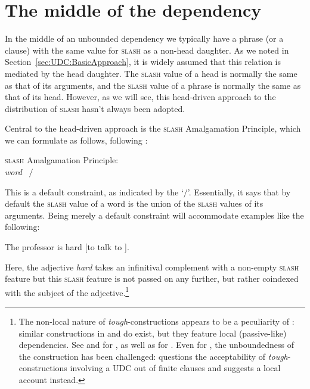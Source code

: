 \documentclass[output=paper,biblatex,babelshorthands,newtxmath,draftmode,colorlinks,citecolor=brown]{langscibook}
\begin{document}
\section{The middle of the dependency}
\label{sec:UDC:Middle}

In the middle of an unbounded dependency we typically have a phrase
(or a clause) with the same value for \textsc{slash} as a non-head daughter. As
we noted in Section~\ref{sec:UDC:BasicApproach}, it is widely assumed
that this relation is mediated by the head daughter. The \textsc{slash} value
of a head is normally the same as that of its arguments, and the \textsc{slash}
value of a phrase is normally the same as that of its head. However,
as we will see, this head-driven approach to the distribution of \textsc{slash}
hasn't always been adopted.

Central to the head-driven approach is the \textsc{slash} Amalgamation Principle,
which we can formulate as follows, following \citet[199]{Ginzburg:Sag:01}:

\ea
\label{fig:UDC:32}\label{udc:slash-amalgamation-principle}
\textsc{slash} Amalgamation Principle:\\
   \textit{word} \impl ~$\slash$%
\z

\noindent
This is a default constraint, as indicated by the `$\slash$'\is{$\slash$}. Essentially,
it says that by default the \textsc{slash} value of a word
is the union of the \textsc{slash} values of its arguments.  Being
merely a
default constraint will accommodate examples like the following:

\begin{exe}
\ex \label{ex:UDC:33}
The professor is hard [to talk to \trace{}].
\end{exe}

\noindent
Here, the adjective \emph{hard} takes an infinitival complement with a
non-empty \textsc{slash} feature 
but this  \textsc{slash} feature
is not passed on any further, but rather coindexed with the subject of
the adjective.\footnote{The
  non-local nature of \textit{tough}-constructions appears to be a
  peculiarity of : similar constructions in  and 
  do exist, but they feature local (passive-like) dependencies. See
  \citet{abeille_a-godard_d-miller_p-sag_i95} and
  \citet{aguila-multner18} for , as well as \citet[Section~3.1.5]{Mueller:02b}
  for . Even for , the unboundedness of the construction
  has been challenged: \citet{Grover:95} questions the acceptability
  of  \textit{tough}-constructions involving a UDC out of
  finite clauses and suggests a local account instead.}
\end{document}
